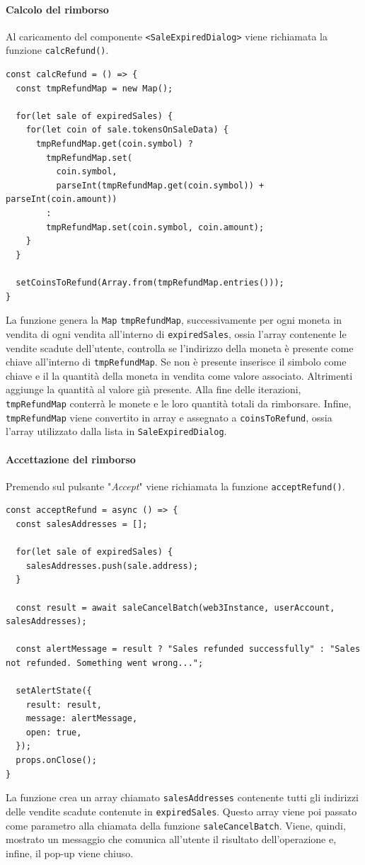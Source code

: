 \documentclass[a4paper]{article}
\begin{document}
        \paragraph{Calcolo del rimborso}
        Al caricamento del componente \verb|<SaleExpiredDialog>| viene richiamata la funzione \verb|calcRefund()|.
        \begin{lstlisting}[style=ES6, title={Funzione calcRefund()}]
const calcRefund = () => {
  const tmpRefundMap = new Map();

  for(let sale of expiredSales) {
    for(let coin of sale.tokensOnSaleData) {
      tmpRefundMap.get(coin.symbol) ?
        tmpRefundMap.set(
          coin.symbol,
          parseInt(tmpRefundMap.get(coin.symbol)) + parseInt(coin.amount))
        :
        tmpRefundMap.set(coin.symbol, coin.amount);
    }
  }

  setCoinsToRefund(Array.from(tmpRefundMap.entries()));
}\end{lstlisting}
        La funzione genera la \verb|Map| \verb|tmpRefundMap|, successivamente per ogni moneta in vendita di ogni vendita all'interno di \verb|expiredSales|, ossia l'array contenente le vendite scadute dell'utente, controlla se l'indirizzo della moneta è presente come chiave
        all'interno di \verb|tmpRefundMap|. Se non è presente inserisce il simbolo come chiave e il la quantità della moneta in vendita come valore associato. Altrimenti aggiunge la quantità al valore già presente.
        Alla fine delle iterazioni, \verb|tmpRefundMap| conterrà le monete e le loro quantità totali da rimborsare. Infine, \verb|tmpRefundMap| viene convertito in array e assegnato a \verb|coinsToRefund|, ossia l'array utilizzato dalla lista in \verb|SaleExpiredDialog|.
        \paragraph{Accettazione del rimborso}
        Premendo sul pulsante "\emph{Accept}" viene richiamata la funzione \verb|acceptRefund()|.
\begin{lstlisting}[style=ES6, title={Funzione acceptRefund()}]
const acceptRefund = async () => {
  const salesAddresses = [];

  for(let sale of expiredSales) {
    salesAddresses.push(sale.address);
  }

  const result = await saleCancelBatch(web3Instance, userAccount, salesAddresses);

  const alertMessage = result ? "Sales refunded successfully" : "Sales not refunded. Something went wrong...";

  setAlertState({
    result: result,
    message: alertMessage,
    open: true,
  });
  props.onClose();
}\end{lstlisting}
        La funzione crea un array chiamato \verb|salesAddresses| contenente tutti gli indirizzi delle vendite scadute contenute in \verb|expiredSales|. Questo array viene poi passato come parametro alla chiamata della funzione \verb|saleCancelBatch|.
        Viene, quindi, mostrato un messaggio che comunica all'utente il risultato dell'operazione e, infine, il pop-up viene chiuso.
\end{document}
